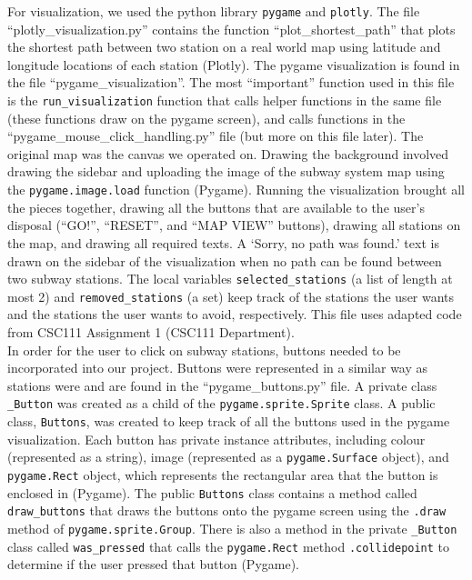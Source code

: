 \documentclass[fontsize=11pt]{article}
\begin{document}
For visualization, we used the python library \texttt{pygame} and \texttt{plotly}. The file ``plotly\_visualization.py” contains the function ``plot\_shortest\_path” that plots the shortest path between two station on a real world map using latitude and longitude locations of each station (Plotly). The pygame visualization is found in the file ``pygame\_visualization”. The most ``important” function used in this file is the \texttt{run\_visualization} function that calls helper functions in the same file (these functions draw on the pygame screen), and calls functions in the ``pygame\_mouse\_click\_handling.py” file (but more on this file later). The original map was the canvas we operated on. Drawing the background involved drawing the sidebar and uploading the image of the subway system map using the \texttt{pygame.image.load} function (Pygame). Running the visualization brought all the pieces together, drawing all the buttons that are available to the user’s disposal (``GO!”, ``RESET”, and ``MAP VIEW” buttons), drawing all stations on the map, and drawing all required texts. A `Sorry, no path was found.’ text is drawn on the sidebar of the visualization when no path can be found between two subway stations. The local variables \texttt{selected\_stations} (a list of length at most 2) and \texttt{removed\_stations} (a set) keep track of the stations the user wants and the stations the user wants to avoid, respectively. This file uses adapted code from CSC111 Assignment 1 (CSC111 Department). \\

In order for the user to click on subway stations, buttons needed to be incorporated into our project. Buttons were represented in a similar way as stations were and are found in the ``pygame\_buttons.py” file. A private class \texttt{\_Button} was created as a child of the \texttt{pygame.sprite.Sprite} class. A public class, \texttt{Buttons}, was created to keep track of all the buttons used in the pygame visualization. Each button has private instance attributes, including colour (represented as a string), image (represented as a \texttt{pygame.Surface} object), and \texttt{pygame.Rect} object, which represents the rectangular area that the button is enclosed in (Pygame). The public \texttt{Buttons} class contains a method called \texttt{draw\_buttons} that draws the buttons onto the pygame screen using the \texttt{.draw} method of \texttt{pygame.sprite.Group}. There is also a method in the private \texttt{\_Button} class called \texttt{was\_pressed} that calls the \texttt{pygame.Rect} method \texttt{.collidepoint} to determine if the user pressed that button (Pygame). \\
\end{document}

